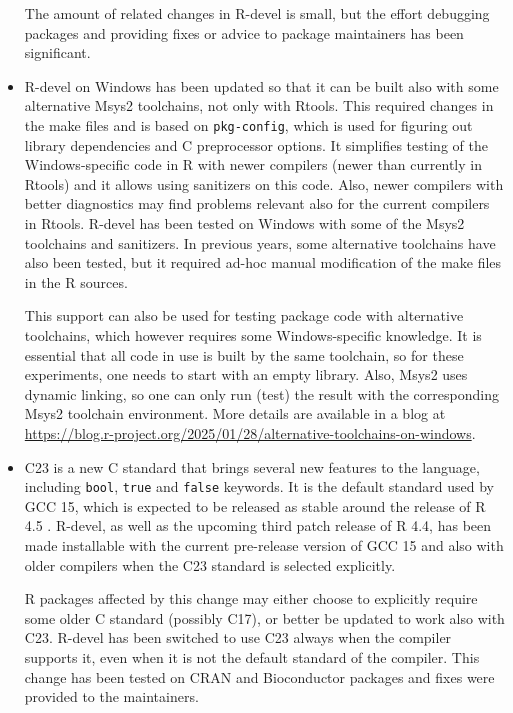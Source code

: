 \begin{itemize}
  The amount of related changes in R-devel is small, but the effort
  debugging packages and providing fixes or advice to package maintainers
  has been significant.
\item
  R-devel on Windows has been updated so that it can be built also with some
  alternative Msys2 toolchains, not only with Rtools. This required changes
  in the make files and is based on \texttt{pkg-config}, which is used for figuring
  out library dependencies and C preprocessor options. It simplifies
  testing of the Windows-specific code in R with newer compilers (newer than
  currently in Rtools) and it allows using sanitizers on this code. Also,
  newer compilers with better diagnostics may find problems relevant also
  for the current compilers in Rtools. R-devel has been tested on Windows
  with some of the Msys2 toolchains and sanitizers. In previous years, some
  alternative toolchains have also been tested, but it required ad-hoc
  manual modification of the make files in the R sources.

  This support can also be used for testing package code with alternative
  toolchains, which however requires some Windows-specific knowledge. It is
  essential that all code in use is built by the same toolchain, so for
  these experiments, one needs to start with an empty library. Also, Msys2
  uses dynamic linking, so one can only run (test) the result with the
  corresponding Msys2 toolchain environment. More details are available in
  a blog at
  \url{https://blog.r-project.org/2025/01/28/alternative-toolchains-on-windows}.
\item
  C23 is a new C standard that brings several new features to the language,
  including \texttt{bool}, \texttt{true} and \texttt{false} keywords. It is the default standard
  used by GCC 15, which is expected to be released as stable around the
  release of R 4.5 . R-devel, as well as the upcoming third patch release of R
  4.4, has been made installable with the current pre-release version of GCC
  15 and also with older compilers when the C23 standard is selected
  explicitly.

  R packages affected by this change may either choose to explicitly require
  some older C standard (possibly C17), or better be updated to work also
  with C23. R-devel has been switched to use C23 always when the compiler
  supports it, even when it is not the default standard of the compiler.
  This change has been tested on CRAN and Bioconductor packages and fixes
  were provided to the maintainers.


\end{itemize}
